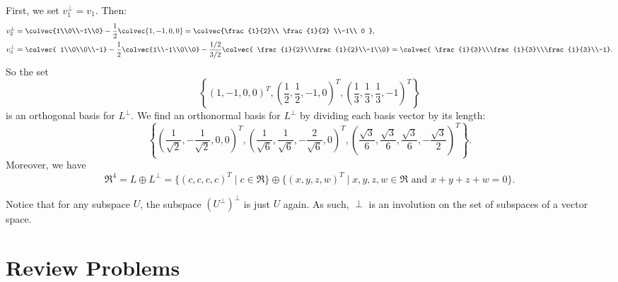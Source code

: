 \begin{example}
First, we set \(v_1^\perp=v_1\). Then:
\begin{align*}
v_2^\perp&=\colvec{1\\0\\-1\\0}-\frac{1}{2}\colvec{1,-1,0,0}
=\colvec{\frac{1}{2}\\ \frac{1}{2} \\-1\\ 0 },\\
v_3^\perp&=\colvec{ 1\\0\\0\\-1} -\frac{1}{2}\colvec{1\\-1\\0\\0}-\frac{1/2}{3/2}
\colvec{ \frac{1}{2}\\\frac{1}{2}\\-1\\0} =\colvec{ \frac{1}{3}\\\frac{1}{3}\\\frac{1}{3}\\-1}.
\end{align*}
So the set \[\left\{ (1,-1,0,0)^T, \left(\frac{1}{2},\frac{1}{2},-1,0\right)^T, \left(\frac{1}{3},\frac{1}{3},\frac{1}{3},-1\right)^T \right\} \] is an orthogonal basis for \(L^\perp\).
We find an orthonormal basis for \(L^\perp\) by dividing each basis vector by its length:
\[
\left\{
\left( \frac{1}{\sqrt{2}}, -\frac{1}{\sqrt{2}},0,0 \right)^T,
\left( \frac{1}{\sqrt{6}}, \frac{1}{\sqrt{6}}, -\frac{2}{\sqrt{6}},0 \right)^T,
\left( \frac{\sqrt{3}}{6}, \frac{\sqrt{3}}{6}, \frac{\sqrt{3}}{6}, -\frac{\sqrt{3}}{2} \right)^T
\right\}.
\]
Moreover, we have
\[
\Re^4=L \oplus L^\perp = \{(c,c,c,c)^T \mid c \in \Re\} \oplus \{(x,y,z,w)^T \mid x,y,z,w \in \Re \text{ and } x+y+z+w=0\}.
\]
\end{example}

Notice that for any subspace $U$, the subspace $(U^\perp)^\perp$ is just $U$ again.  As such, $\perp$ is an involution on the set of subspaces of a vector space.

%

\section{Review Problems}


\newpage

